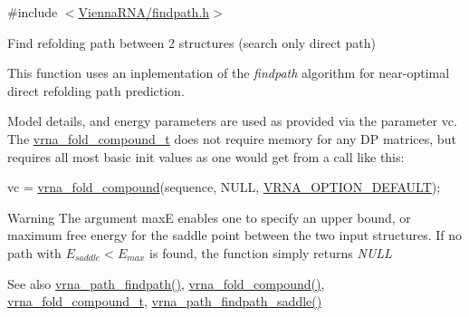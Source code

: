 {\ttfamily \#include $<$\mbox{\hyperlink{findpath_8h}{Vienna\+R\+N\+A/findpath.\+h}}$>$}



Find refolding path between 2 structures (search only direct path) 

This function uses an inplementation of the {\itshape findpath} algorithm \cite{flamm:2001} for near-\/optimal direct refolding path prediction.

Model details, and energy parameters are used as provided via the parameter \textquotesingle{}vc\textquotesingle{}. The \mbox{\hyperlink{group__fold__compound_ga1b0cef17fd40466cef5968eaeeff6166}{vrna\+\_\+fold\+\_\+compound\+\_\+t}} does not require memory for any DP matrices, but requires all most basic init values as one would get from a call like this\+: 
\begin{DoxyCode}
vc = \mbox{\hyperlink{group__fold__compound_ga6601d994ba32b11511b36f68b08403be}{vrna\_fold\_compound}}(sequence, NULL, \mbox{\hyperlink{group__fold__compound_gacea5b7ee6181c485f36e2afa0e9089e4}{VRNA\_OPTION\_DEFAULT}});
\end{DoxyCode}


\begin{DoxyWarning}{Warning}
The argument {\ttfamily maxE} enables one to specify an upper bound, or maximum free energy for the saddle point between the two input structures. If no path with $E_{saddle} < E_{max}$ is found, the function simply returns {\itshape N\+U\+LL} 
\end{DoxyWarning}
\begin{DoxySeeAlso}{See also}
\mbox{\hyperlink{group__direct__paths_ga4b2283c4142cafd99678495585fcc842}{vrna\+\_\+path\+\_\+findpath()}}, \mbox{\hyperlink{group__fold__compound_ga6601d994ba32b11511b36f68b08403be}{vrna\+\_\+fold\+\_\+compound()}}, \mbox{\hyperlink{group__fold__compound_ga1b0cef17fd40466cef5968eaeeff6166}{vrna\+\_\+fold\+\_\+compound\+\_\+t}}, \mbox{\hyperlink{group__direct__paths_gad611574a76593e26021f177e7854b6b4}{vrna\+\_\+path\+\_\+findpath\+\_\+saddle()}}
\end{DoxySeeAlso}

